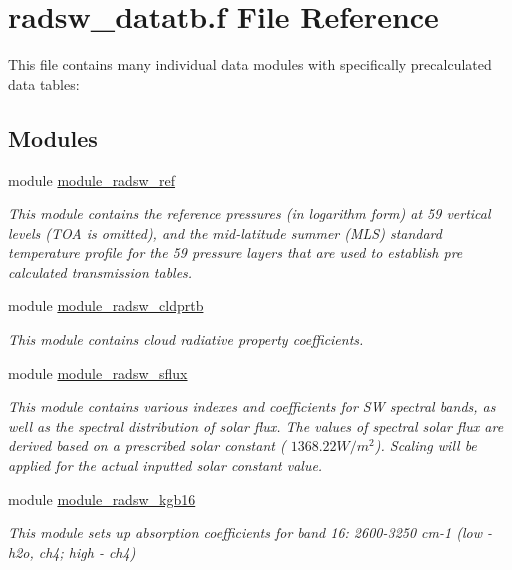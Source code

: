 \hypertarget{radsw__datatb_8f}{}\section{radsw\+\_\+datatb.\+f File Reference}
\label{radsw__datatb_8f}


This file contains many individual data modules with specifically precalculated data tables\+:  


\subsection*{Modules}
\begin{DoxyCompactItemize}
\item 
module \hyperlink{namespacemodule__radsw__ref}{module\+\_\+radsw\+\_\+ref}
\begin{DoxyCompactList}\small\item\em This module contains the reference pressures (in logarithm form) at 59 vertical levels (T\+OA is omitted), and the mid-\/latitude summer (M\+LS) standard temperature profile for the 59 pressure layers that are used to establish pre calculated transmission tables. \end{DoxyCompactList}\item 
module \hyperlink{namespacemodule__radsw__cldprtb}{module\+\_\+radsw\+\_\+cldprtb}
\begin{DoxyCompactList}\small\item\em This module contains cloud radiative property coefficients. \end{DoxyCompactList}\item 
module \hyperlink{namespacemodule__radsw__sflux}{module\+\_\+radsw\+\_\+sflux}
\begin{DoxyCompactList}\small\item\em This module contains various indexes and coefficients for SW spectral bands, as well as the spectral distribution of solar flux. The values of spectral solar flux are derived based on a prescribed solar constant ( $1368.22 W/m^2$). Scaling will be applied for the actual inputted solar constant value. \end{DoxyCompactList}\item 
module \hyperlink{namespacemodule__radsw__kgb16}{module\+\_\+radsw\+\_\+kgb16}
\begin{DoxyCompactList}\small\item\em This module sets up absorption coefficients for band 16\+: 2600-\/3250 cm-\/1 (low -\/ h2o, ch4; high -\/ ch4) \end{DoxyCompactList}\item 

\end{DoxyCompactItemize}
